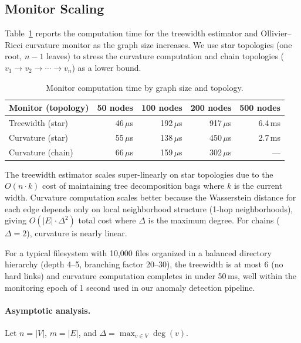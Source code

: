 \documentclass[11pt,a4paper]{article}
\theoremstyle{definition}
\theoremstyle{remark}
\begin{document}
\subsection{Monitor Scaling}
\label{sec:eval-monitors}

Table~\ref{tab:monitors} reports the computation time for the
treewidth estimator and Ollivier--Ricci curvature monitor as the
graph size increases. We use star topologies (one root, $n-1$ leaves)
to stress the curvature computation and chain topologies
($v_1 \to v_2 \to \cdots \to v_n$) as a lower bound.

\begin{table}[H]
\centering
\caption{Monitor computation time by graph size and topology.}
\label{tab:monitors}
\small
\begin{tabular}{@{}lrrrr@{}}
\toprule
\textbf{Monitor (topology)} & \textbf{50 nodes} & \textbf{100 nodes} & \textbf{200 nodes} & \textbf{500 nodes} \\
\midrule
Treewidth (star)    & 46\,$\mu$s  & 192\,$\mu$s  & 917\,$\mu$s  & 6.4\,ms \\
Curvature (star)    & 55\,$\mu$s  & 138\,$\mu$s  & 450\,$\mu$s  & 2.7\,ms \\
Curvature (chain)   & 66\,$\mu$s  & 159\,$\mu$s  & 302\,$\mu$s  & --- \\
\bottomrule
\end{tabular}
\end{table}

The treewidth estimator scales super-linearly on star topologies due
to the $O(n \cdot k)$ cost of maintaining tree decomposition bags
where $k$ is the current width. Curvature computation scales
better because the Wasserstein distance for each edge depends only on
local neighborhood structure (1-hop neighborhoods), giving
$O(|E| \cdot \Delta^2)$ total cost where $\Delta$ is the maximum
degree. For chains ($\Delta = 2$), curvature is nearly linear.

For a typical filesystem with 10{,}000 files organized in a balanced
directory hierarchy (depth 4--5, branching factor 20--30), the
treewidth is at most 6 (no hard links) and curvature computation
completes in under 50\,ms, well within the monitoring epoch of
1 second used in our anomaly detection pipeline.

\paragraph{Asymptotic analysis.}
Let $n = |V|$, $m = |E|$, and $\Delta = \max_{v \in V} \deg(v)$.
\end{document}
